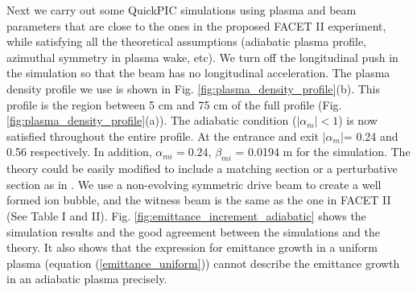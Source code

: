 \documentclass[%
reprint, superscriptaddress,
 amsmath,amssymb, aps,
prstab,
]{revtex4-2}
\begin{document}
Next we carry out some QuickPIC simulations using plasma and beam parameters that are close to the ones in the proposed FACET II experiment, while satisfying all the theoretical assumptions (adiabatic plasma profile, azimuthal symmetry in plasma wake, etc). We turn off the longitudinal push in the simulation so that the beam has no longitudinal acceleration. The plasma density profile we use is shown in Fig. \ref{fig:plasma_density_profile}(b). This profile is the region between 5 cm and 75 cm of the full profile (Fig. \ref{fig:plasma_density_profile}(a)). The adiabatic condition ($|\alpha_{m}|  < 1 $) is now satisfied throughout the entire profile. At the entrance and exit  $|\alpha_{m}|$= 0.24 and 0.56 respectively. In addition, $\alpha_{mi} = 0.24$, $\beta_{mi}$ = 0.0194 m for the simulation.  
The theory could be easily modified to include a matching section \cite{Xinlu2016} or a perturbative section as in \cite{Robert}. 
We use a non-evolving symmetric drive beam to create a well formed ion bubble, and the witness beam is the same as the one in FACET II (See Table I and II). Fig. \ref{fig:emittance_increment_adiabatic} shows the simulation results and the good agreement between the simulations and the theory. It also shows that the expression for emittance growth in a uniform plasma (equation (\ref{emittance_uniform})) cannot describe the emittance growth in an adiabatic plasma precisely.
\end{document}
